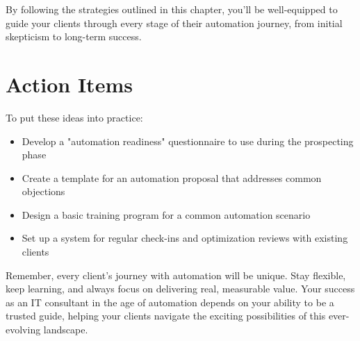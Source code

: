 By following the strategies outlined in this chapter, you'll be well-equipped to guide your clients through every stage of their automation journey, from initial skepticism to long-term success.


\section{Action Items}

To put these ideas into practice:

\begin{itemize}
    \item Develop a "automation readiness" questionnaire to use during the prospecting phase
    \item Create a template for an automation proposal that addresses common objections
    \item Design a basic training program for a common automation scenario
    \item Set up a system for regular check-ins and optimization reviews with existing clients
\end{itemize}

Remember, every client's journey with automation will be unique. Stay flexible, keep learning, and always focus on delivering real, measurable value. Your success as an IT consultant in the age of automation depends on your ability to be a trusted guide, helping your clients navigate the exciting possibilities of this ever-evolving landscape.